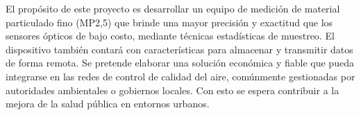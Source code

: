 
El propósito de este proyecto es desarrollar un equipo de medición de material particulado fino (MP2,5) que brinde una mayor precisión y exactitud que los sensores ópticos de bajo costo, mediante técnicas estadísticas de muestreo. El dispositivo también contará con características para almacenar y transmitir datos de forma remota. Se pretende elaborar una solución económica y fiable que pueda integrarse en las redes de control de calidad del aire, comúnmente gestionadas por autoridades ambientales o gobiernos locales. Con esto se espera contribuir a la mejora de la salud pública en entornos urbanos. 


%
